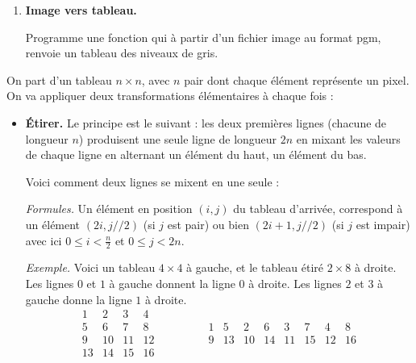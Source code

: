 \documentclass[11pt,class=report,crop=false]{standalone}
\begin{document}
\begin{activite}
\begin{enumerate}
  
  
  \item \textbf{Image vers tableau.} 
  
  Programme une fonction  
  qui à partir d'un fichier image au format \og{}pgm\fg{}, renvoie un tableau des niveaux de gris.
\end{enumerate}

\end{activite}


\begin{cours}

On part d'un tableau $n\times n$, avec $n$ pair dont chaque élément représente un pixel. 
On va appliquer deux transformations élémentaires à chaque fois :

\begin{itemize}
  \item \textbf{Étirer.} Le principe est le suivant : les deux premières lignes (chacune de longueur $n$) produisent une seule ligne de longueur $2n$ en mixant les valeurs de chaque ligne en alternant un élément du haut, un élément du bas.

\medskip
 

Voici comment deux lignes se mixent en une seule :

\medskip

\emph{Formules.} Un élément en position $(i,j)$ du tableau d'arrivée, correspond à un élément $(2i,j//2)$ (si $j$ est pair) ou bien $(2i+1,j//2)$ (si $j$ est impair) avec ici $0 \le i < \frac n2$ et $0 \le j < 2n$.

\medskip

\emph{Exemple.} Voici un tableau $4 \times 4$ à gauche, et le tableau étiré $2 \times 8$ à droite.
Les lignes $0$ et $1$ à gauche donnent la ligne $0$ à droite.
Les lignes $2$ et $3$ à gauche donne la ligne $1$ à droite.
$$\begin{array}{cccc} 
  1& 2& 3& 4\\ 
  5& 6& 7& 8\\  
  9&10&11&12\\  
 13&14&15&16  
\end{array}\qquad\qquad 
\begin{array}{cccccccc} 
  1& 5& 2& 6& 3& 7& 4& 8  \\
  9&13&10&14&11&15&12&16
\end{array}$$
  

\end{itemize}
\end{cours}
\end{document}
